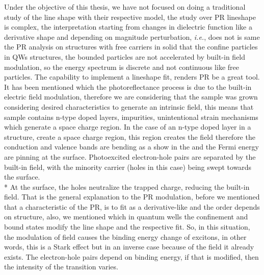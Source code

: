 Under the objective of this thesis, we have not focused on doing a traditional study of the line shape with their respective model, the study over PR lineshape is complex, the interpretation starting from changes in dielectric function like a derivative shape and depending on magnitude perturbation, \textit{i.e.}, does not is same the  PR analysis on structures with free carriers in solid that the confine particles in QWs structures, the bounded particles are not accelerated by built-in field modulation, so the energy spectrum is discrete and not continuous like free particles.  The capability to implement a lineshape fit,  renders PR be a great tool. 
It has been mentioned which the photoreflectance process is due to the built-in electric field modulation, therefore we are considering that the sample was grown considering desired characteristics to generate an intrinsic field, this means that sample contains n-type doped layers, impurities, unintentional strain mechanisms which generate a space charge region. In the case of an n-type doped layer in a structure, create a space charge region, this region creates the field therefore the conduction and valence bands are bending as a show in the  and the Fermi energy are pinning at the surface. Photoexcited electron-hole pairs are separated by the built-in field, with the
minority carrier (holes in this case) being swept towards the surface.\\*
At the surface, the holes neutralize the trapped charge, reducing the built-in field\cite{misiewicz1999photoreflectance}. That is the general explanation to the PR modulation, before we mentioned that a characteristic of the PR, is to fit as a derivative-like and the order depends on structure, also, we mentioned which in quantum wells the confinement and bound states modify the line shape and the respective fit. So, in this situation, the modulation of field causes the binding energy change of excitons, in other words, this is a Stark effect but in an inverse case because of the field it already exists. The electron-hole pairs depend on binding energy,  if that is modified, then the intensity of the transition varies.  




